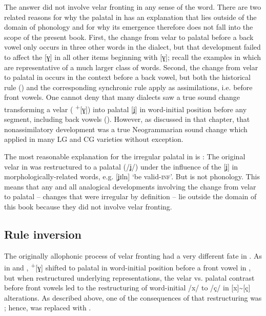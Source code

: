The answer did not involve velar fronting in any sense of the word. There are two related reasons for why the palatal in  has an explanation that lies outside of the domain of phonology and for why its emergence therefore does not fall into the scope of the present book. First, the change from velar to palatal before a back vowel only occurs in three other words in the  dialect, but that development failed to affect the [ɣ] in all other items beginning with [ɣ]; recall the examples in  which are representative of a much larger class of words. Second, the change from velar to palatal in  occurs in the context before a back vowel, but both the historical rule () and the corresponding synchronic rule apply as assimilations, i.e. before front vowels. One cannot deny that many dialects saw a true sound change transforming a velar ( \textsuperscript{+}[ɣ]) into palatal [ʝ] in word-initial position before any segment, including back vowels (). However, as discussed in that chapter, that nonassimilatory development was a true Neogrammarian sound change which applied in many LG and CG varieties without exception.

The most reasonable explanation for the irregular palatal in  is :  The original velar in  was restructured to a palatal (/ʝ/) under the influence of the [ʝ] in  morphologically-related words, e.g. [ʝɪln] ‘be valid\textsc{{}-inf}’. But  is not phonology. This means that any and all analogical developments involving the change from velar to palatal -- changes that were irregular by definition -- lie outside the domain of this book because they did not involve velar fronting.

\subsection{Rule inversion}\label{sec:8.6.3}
\begin{sloppypar}
The originally allophonic process of velar fronting had a very different fate in . As in  and ,  \textsuperscript{+}[ɣ] shifted to palatal in word-initial position before a front vowel in , but when  restructured underlying representations, the velar vs. palatal contrast before front vowels led to the restructuring of word-initial /x/ to /ç/ in [x]{\textasciitilde}[ç] alterations. As described above, one of the consequences of that restructuring was ; hence,  was replaced with .
\end{sloppypar}


